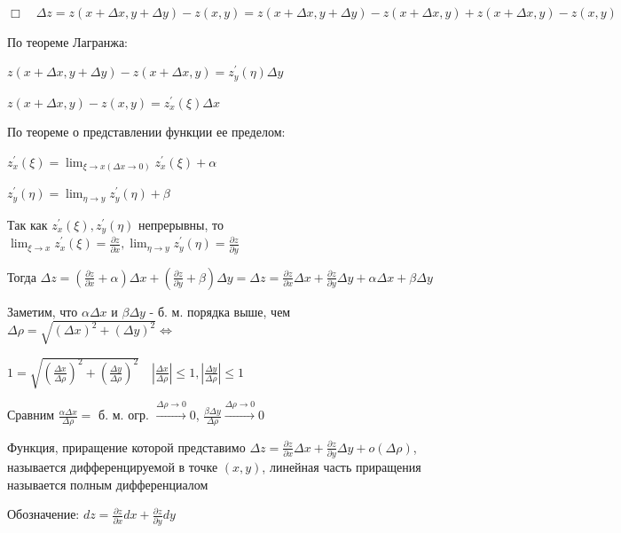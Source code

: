 \documentclass[12pt]{article}
\begin{document}
    $\displaystyle \Box \quad \Delta z = z (x + \Delta x, y + \Delta y) - z (x, y) = z(x + \Delta x, y + \Delta y) - z(x + \Delta x, y) +
    z(x + \Delta x, y) - z(x, y)$

    По теореме Лагранжа:

    $\displaystyle z(x + \Delta x, y + \Delta y) - z(x + \Delta x, y) = z^\prime_y(\eta) \Delta y$

    $\displaystyle z(x + \Delta x, y) - z(x, y) = z^\prime_x(\xi)\Delta x$

    По теореме о представлении функции ее пределом:

    $\displaystyle z^\prime_x(\xi) = \lim_{\xi \to x (\Delta x \to 0)} z^\prime_x(\xi) + \alpha$

    $\displaystyle z^\prime_y(\eta) = \lim_{\eta \to y} z^\prime_y(\eta) + \beta$

    Так как $\displaystyle z^\prime_x(\xi), z^\prime_y(\eta)$ непрерывны, то $\displaystyle \lim_{\xi \to x} z^\prime_x(\xi) = \frac{\partial z}{\partial x}, \lim_{\eta \to y} z^\prime_y(\eta) = \frac{\partial z}{\partial y}$

    Тогда $\displaystyle \Delta z = \left(\frac{\partial z}{\partial x} + \alpha\right) \Delta x + \left(\frac{\partial z}{\partial y} + \beta\right)\Delta y =
    \Delta z = \frac{\partial z}{\partial x}\Delta x + \frac{\partial z}{\partial y}\Delta y + \alpha \Delta x + \beta \Delta y$

    Заметим, что $\displaystyle \alpha \Delta x$ и $\displaystyle \beta \Delta y$ - б. м. порядка выше, чем $\displaystyle \Delta \rho = \sqrt{(\Delta x)^2 + (\Delta y)^2} \Longleftrightarrow$

    $\displaystyle 1 = \sqrt{\left(\frac{\Delta x}{\Delta \rho}\right)^2 + \left(\frac{\Delta y}{\Delta \rho}\right)^2} \quad |\frac{\Delta x}{\Delta \rho}| \leq 1, |\frac{\Delta y}{\Delta \rho}| \leq 1$

    Сравним $\displaystyle \frac{\alpha \Delta x}{\Delta \rho} =$ б. м. огр. $\displaystyle \stackrel{\Delta \rho \to 0}{\to} 0$, $\displaystyle \frac{\beta \Delta y}{\Delta \rho} \stackrel{\Delta \rho \to 0}{\to} 0$

    Функция, приращение которой представимо $\displaystyle \Delta z = \frac{\partial z}{\partial x}\Delta x + \frac{\partial z}{\partial y}\Delta y + o(\Delta \rho)$, называется дифференцируемой в точке $\displaystyle (x, y)$,
    линейная часть приращения называется полным дифференциалом

    Обозначение: $\displaystyle dz = \frac{\partial z}{\partial x} dx + \frac{\partial z}{\partial y} dy$
\end{document}
